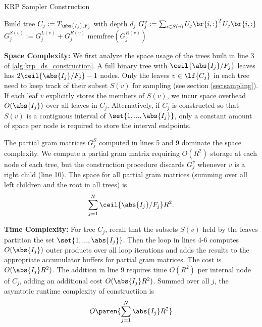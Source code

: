 \begin{algorithm}
\caption{KRP Sampler Construction}
\begin{algorithmic}[1]
            \State Build tree $C_j := T_{\abs{I_j}, F_j}$ with depth $d_j$
                \State $G_j^{v} := \sum_{i \in S(v)} U_j\br{i, :}^T U_j \br{i, :}$
            \EndFor
                    \State $G_j^{S(v)} := G_j^{L(v)} + G_j^{R(v)}$ 
                    \State $\textrm{memfree} (G_j^{R(v)})$
                \EndFor
            \EndFor
        \EndFor
    \EndProcedure 
\end{algorithmic}
\label{alg:krp_ds_construction}
\end{algorithm}

\textbf{Space Complexity: } We first analyze the space
usage of the trees built in line 3 of \ref{alg:krp_ds_construction}. 
A full binary tree with 
$\ceil{\abs{I_j} / F_j}$ leaves has $2 \ceil{\abs{I_j} / F_j} - 1$
nodes. Only the leaves $v \in \lf{C_j}$ in each tree need to keep 
track of their subset $S(v)$ for sampling 
(see section \ref{sec:sampling}). If each leaf $v$ explicitly stores
the members of $S(v)$, we incur space overhead $O(\abs{I_j})$
over all leaves in $C_j$. Alternatively, if $C_j$ is constructed
so that $S(v)$ is a contiguous interval of $\set{1, ..., \abs{I_j}}$,
only a constant amount of space per node is required to store
the interval endpoints.

The partial gram matrices $G_j^S$ computed in lines 5 and 9 
dominate the space complexity. We compute a partial gram matrix
requiring $O(R^2)$ storage at each node of each tree, but the
construction procedure discards $G_j^v$ whenever $v$ is
a right child (line 10). The space for all partial gram 
matrices (summing over all 
left children and the root in all trees) is 
$$\sum_{j=1}^N \ceil{\abs{I_j} / F_j} R^2.$$

\textbf{Time Complexity: } For tree $C_j$, recall that the subsets
$S(v)$ held by the leaves partition the set $\set{1, ..., \abs{I_j}}$.
Then the loop in lines 4-6 
computes $O(\abs{I_j})$ outer products over
all loop iterations and adds the results to the appropriate
accumulator buffers for partial gram matrices. The cost is 
$O(\abs{I_j} R^2)$. The addition in line 9 requires time $O(R^2)$
per internal node of $C_j$, adding an additional cost 
$O(\abs{I_j} R^2)$. Summed over all $j$, the asymtotic runtime
complexity of constructiion is
$$O \paren{\sum_{j=1}^N \abs{I_j} R^2}$$


